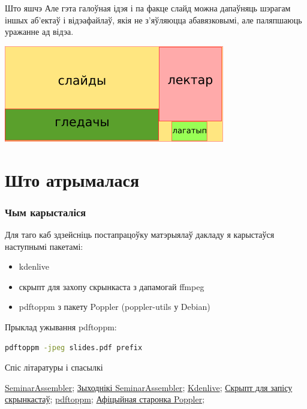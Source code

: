 \documentclass[ignorenonframetext,hyperref={pdftex,unicode}]{beamer}
\begin{document}
\begin{frame}{Што яшчэ} 
	Але гэта галоўная ідэя і па факце слайд можна дапаўняць шэрагам іншых аб'ектаў і відэафайлаў, якія не з'яўляюцца абавязковымі, але паляпшаюць уражанне ад відэа.
	\begin{center}
 		\includegraphics[height=0.5\textheight,keepaspectratio]{3}		
	\end{center}
\end{frame}

\section{Што атрымалася}

\begin{frame}[fragile]
	\frametitle{Чым карысталіся} 
	Для таго каб здзейсніць постапрацоўку матэрыялаў дакладу я карыстаўся наступнымі пакетамі:
	\begin{itemize}
		\item kdenlive\cite{kdenlive}
		\item скрыпт для захопу скрынкаста з дапамогай ffmpeg\cite{screencast}
		\item pdftoppm\cite{pdftoppm} з пакету Poppler\cite{poppler} (poppler-utils у Debian)
	\end{itemize}
	
	Прыклад ужывання pdftoppm:
		\begin{lstlisting}[language=bash]
pdftoppm -jpeg slides.pdf prefix
		\end{lstlisting}
\end{frame}

\frame{\questionslide}

\begin{frame}{Спіс літаратуры і спасылкі}
	\begin{thebibliography}{10}
	\beamertemplatetextbibitems
		{\sc \href{http://wiki.4intra.net/SeminarAssembler}{SeminarAssembler}};
		{\sc \href{https://abf.io/belonesox/seminar-assembler/}{Зыходнікі SeminarAssembler}};
		{\sc \href{https://kdenlive.org/}{Kdenlive}};
		{\sc \href{https://github.com/measles/mlug\_screencast\_sound}{Скрыпт для запісу скрынкастаў}};
		{\sc \href{http://linux.die.net/man/1/pdftoppm}{pdftoppm}};
		{\sc \href{https://poppler.freedesktop.org/}{Афіцыйная старонка Poppler}};
	\end{thebibliography}
\end{frame}
\end{document}
